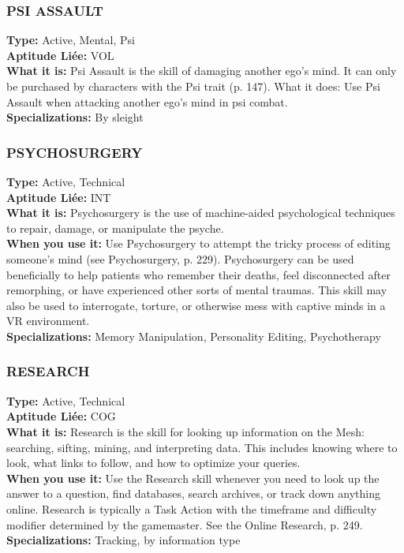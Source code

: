 \subsubsection{PSI ASSAULT} \textbf{Type:} Active, Mental, Psi \\ \textbf{Aptitude Liée:} VOL \\ \textbf{What it is:} Psi Assault is the skill of damaging another ego’s mind. It can only be purchased by characters with the Psi trait (p. 147). What it does: Use Psi Assault when attacking another ego’s mind in psi combat. \\ \textbf{Specializations:} By sleight 

\subsubsection{PSYCHOSURGERY} \textbf{Type:} Active, Technical \\ \textbf{Aptitude Liée:} INT \\ \textbf{What it is:} Psychosurgery is the use of machine-aided psychological techniques to repair, damage, or manipulate the psyche. \\ \textbf{When you use it:} Use Psychosurgery to attempt the tricky process of editing someone’s mind (see Psychosurgery, p. 229). Psychosurgery can be used beneficially to help patients who remember their deaths, feel disconnected after remorphing, or have experienced other sorts of mental traumas. This skill may also be used to interrogate, torture, or otherwise mess with captive minds in a VR environment. \\ \textbf{Specializations:} Memory Manipulation, Personality Editing, Psychotherapy 

\subsubsection{RESEARCH} \textbf{Type:} Active, Technical \\ \textbf{Aptitude Liée:} COG \\ \textbf{What it is:} Research is the skill for looking up information on the Mesh: searching, sifting, mining, and interpreting data. This includes knowing where to look, what links to follow, and how to optimize your queries. \\ \textbf{When you use it:} Use the Research skill whenever you need to look up the answer to a question, find databases, search archives, or track down anything online. Research is typically a Task Action with the timeframe and difficulty modifier determined by the gamemaster. See the Online Research, p. 249. \\ \textbf{Specializations:} Tracking, by information type 

